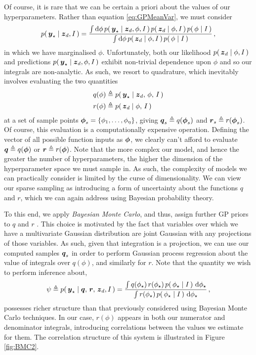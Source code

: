 \documentclass{acmtrans2m}
\begin{document}
\noindent Of course, it is rare that we can be certain a priori about the values of our hyperparameters. Rather than equation \eqref{eq:GPMeanVar}, we must consider
\begin{equation} \label{eq:Marginalising}
 p\!\left(\,\boldsymbol{y}_\star\mid\boldsymbol{z}_d,I\,\right)=\frac{\int\mathrm{d}\phi\, p\!\left(\,\boldsymbol{y}_\star\mid\boldsymbol{z}_d,\phi,I\,\right)p\!\left(\,\boldsymbol{z}_d\mid\phi,I\,\right)p\!\left(\,\phi\mid I\,\right)}
{\int\mathrm{d}\phi\, p\!\left(\,\boldsymbol{z}_d\mid\phi,I\,\right)p\!\left(\,\phi\mid I\,\right)}\,,
\end{equation}
in which we have marginalised $\phi$. Unfortunately, both our likelihood $p\!\left(\,\boldsymbol{z}_d\mid\phi,I\,\right)$ and predictions $p\!\left(\,\boldsymbol{y}_\star\mid\boldsymbol{z}_d,\phi,I\,\right)$ exhibit non-trivial dependence upon $\phi$ and so our integrals are non-analytic. As such, we resort to quadrature, which inevitably involves evaluating the two quantities
\begin{equation}
\begin{split}
q(\phi)& \triangleq p\!\left(\,\boldsymbol{y}_\star\mid\boldsymbol{z}_d,\,\phi,\,I\,\right) \\
r(\phi)& \triangleq p\!\left(\,\boldsymbol{z}_d\mid\phi,\,I\,\right)
\end{split}
\end{equation}
at a set of sample points $\boldsymbol{\phi}_s=\{\phi_1,\ldots,\phi_\eta\}$, giving $\boldsymbol{q}_s\triangleq q(\boldsymbol{\phi}_s)$ and $\boldsymbol{r}_s\triangleq r(\boldsymbol{\phi}_s)$. Of course, this evaluation is a computationally expensive operation. Defining the vector of all possible function inputs as $\boldsymbol{\phi}$, we clearly can't afford to evaluate $\boldsymbol{q}\triangleq q(\boldsymbol{\phi})$ or $\boldsymbol{r}\triangleq r(\boldsymbol{\phi})$. Note that the more complex our model, and hence the greater the number of hyperparameters, the higher the dimension of the hyperparameter space we must sample in. As such, the complexity of models we can practically consider is limited by the curse of dimensionality. We can view our sparse sampling as introducing a form of uncertainty about the functions $q$ and $r$, which we can again address using Bayesian probability theory. 

To this end, we apply \emph{Bayesian Monte Carlo}, and thus, assign further GP priors to $q$ and $r$ \cite{BZMonteCarlo}. This choice is motivated by the fact that variables over which we have a multivariate Gaussian distribution are joint Gaussian with any projections of those variables. As such, given that integration is a projection, we can use our computed samples $\boldsymbol{q}_s$ in order to perform Gaussian process regression about the value of integrals over $q(\phi)$, and similarly for $r$. Note that the quantity we wish to perform inference about, 
\begin{equation}
 \psi\triangleq p\!\left(\,\boldsymbol{y}_\star\mid\boldsymbol{q},\,\boldsymbol{r},\,\boldsymbol{z}_d,I\,\right)= \frac{\int q(\phi_\star)\,r(\phi_\star)\,p\!\left(\,\phi_\star\mid I\,\right)\,\mathrm{d}\phi_\star}
{\int r(\phi_\star)\,p\!\left(\,\phi_\star\mid I\,\right)\,\mathrm{d}\phi_\star}\,,
\end{equation} 
possesses richer structure than that previously considered using Bayesian Monte Carlo techniques. In our case, $r(\phi)$ appears in both our numerator and denominator integrals, introducing correlations between the values we estimate for them. The correlation structure of this system is illustrated in Figure \ref{fig:BMC2}. 
\end{document}
